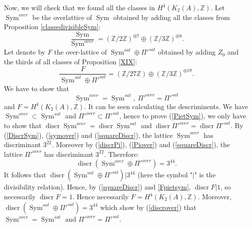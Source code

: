 \documentclass{alggeom}
\DeclareMathOperator{\Sym}{Sym}
\DeclareMathOperator{\discr}{discr}
\newcommand{\kum}[2]{K_{ #2 }( #1 )}
\newcommand{\X}{\kum{A}{2}}
\newcommand{\Z}{\mathbb{Z}}
\theoremstyle{plain}
\theoremstyle{definition}
\theoremstyle{remark}
\begin{document}
Now, we will check that we found all the classes in $H^4(\X,\Z)$.
Let $\Sym^{over}$ be the overlattice of $\Sym$ obtained by adding all the classes from Proposition \ref{classedivisibleSym}:
\begin{equation}
\frac{\Sym}{\Sym^{over}}=(\Z/2\Z)^{\oplus 7}\oplus(\Z/3\Z)^{\oplus 8}. 
\label{symover} 
\end{equation}
Let denote by $F$ the over-lattice of $\Sym^{sat}\oplus \Pi'^{sat}$ obtained by adding $Z_0$ and the thirds of all classes of Proposition \ref{XIX}:
\begin{equation}
\frac{F}{\Sym^{sat}\oplus \Pi'^{sat}}=(\Z/27\Z)\oplus(\Z/3\Z)^{\oplus 19}.
\label{Fpietsym}
\end{equation}
We have to show that 
\begin{equation}
\Sym^{over}=\Sym^{sat},\ \Pi'^{over}=\Pi'^{sat}
\label{PietSym}
\end{equation}
and $F=H^4(\X,\Z)$.
It can be seen calculating the descriminents. 
We have $\Sym^{over}\subset \Sym^{sat}$ and $\Pi'^{over}\subset\Pi'^{sat}$, hence to prove (\ref{PietSym}), we only have to show that 
$\discr \Sym^{over}=\discr \Sym^{sat}$ and $\discr \Pi'^{over}=\discr\Pi'^{sat}$.
By (\ref{DiscrSym}), (\ref{symover}) and (\ref{squareDiscr}), the lattice $\Sym^{over}$ has discriminant $3^{22}$. Moreover by (\ref{discrPi}), (\ref{Piover}) and (\ref{squareDiscr}), 
the lattice $\Pi'^{over}$ has discriminant $3^{22}$. Therefore:
\begin{equation}
\discr\left(\Sym^{over}\oplus \Pi'^{over}\right)=3^{44}.
\label{discrover}
\end{equation}
It follows that $\discr \left(\Sym^{sat}\oplus \Pi'^{sat}\right) | 3^{44}$ (here the symbol "$|$" is the divisibility relation).
Hence, by (\ref{squareDiscr}) and \ref{Fpietsym}, $\discr F | 1$, so necessarily $\discr F=1$. Hence necessarily $F=H^4(K_2(A),\Z)$. Moreover, $\discr \left(\Sym^{sat}\oplus \Pi'^{sat}\right)=3^{44}$ 
which show by (\ref{discrover}) that $\Sym^{over}=\Sym^{sat} \text{ and } \Pi'^{over}=\Pi'^{sat}.$ 
\end{document}
